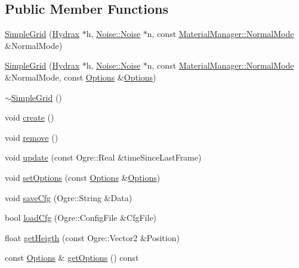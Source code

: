 \subsection*{Public Member Functions}
\begin{CompactItemize}
\item 
\hyperlink{class_hydrax_1_1_module_1_1_simple_grid_1576c59a302b3c24ac3d7dd8598e608c}{SimpleGrid} (\hyperlink{class_hydrax_1_1_hydrax}{Hydrax} $\ast$h, \hyperlink{class_hydrax_1_1_noise_1_1_noise}{Noise::Noise} $\ast$n, const \hyperlink{class_hydrax_1_1_material_manager_aa14689cd1c259f48954dfecda9b296f}{MaterialManager::NormalMode} \&NormalMode)
\item 
\hyperlink{class_hydrax_1_1_module_1_1_simple_grid_ae091cd103798dcc8f8b92af7dbfccef}{SimpleGrid} (\hyperlink{class_hydrax_1_1_hydrax}{Hydrax} $\ast$h, \hyperlink{class_hydrax_1_1_noise_1_1_noise}{Noise::Noise} $\ast$n, const \hyperlink{class_hydrax_1_1_material_manager_aa14689cd1c259f48954dfecda9b296f}{MaterialManager::NormalMode} \&NormalMode, const \hyperlink{struct_hydrax_1_1_module_1_1_simple_grid_1_1_options}{Options} \&\hyperlink{struct_hydrax_1_1_module_1_1_simple_grid_1_1_options}{Options})
\item 
\hyperlink{class_hydrax_1_1_module_1_1_simple_grid_a697faa687d55e5f211bae56e0ec9d14}{$\sim$SimpleGrid} ()
\item 
void \hyperlink{class_hydrax_1_1_module_1_1_simple_grid_7e52fb7497f6a2d27666a384d7a1d003}{create} ()
\item 
void \hyperlink{class_hydrax_1_1_module_1_1_simple_grid_ca3e257313599b797b8a65442cecd3cc}{remove} ()
\item 
void \hyperlink{class_hydrax_1_1_module_1_1_simple_grid_aa120d4f487785136a3134cc8980fb16}{update} (const Ogre::Real \&timeSinceLastFrame)
\item 
void \hyperlink{class_hydrax_1_1_module_1_1_simple_grid_6b83cb95b2803b068a53bf76afaa9ac4}{setOptions} (const \hyperlink{struct_hydrax_1_1_module_1_1_simple_grid_1_1_options}{Options} \&\hyperlink{struct_hydrax_1_1_module_1_1_simple_grid_1_1_options}{Options})
\item 
void \hyperlink{class_hydrax_1_1_module_1_1_simple_grid_f79cb3a457da1fe8b015d9d7b5a6a376}{saveCfg} (Ogre::String \&Data)
\item 
bool \hyperlink{class_hydrax_1_1_module_1_1_simple_grid_3741ec1a3df1863e730711fd9d3b14e1}{loadCfg} (Ogre::ConfigFile \&CfgFile)
\item 
float \hyperlink{class_hydrax_1_1_module_1_1_simple_grid_9a9e5bba632f0317c82370fa433559ac}{getHeigth} (const Ogre::Vector2 \&Position)
\item 
const \hyperlink{struct_hydrax_1_1_module_1_1_simple_grid_1_1_options}{Options} \& \hyperlink{class_hydrax_1_1_module_1_1_simple_grid_bcc8d6a849224e8558162adb8f3baf69}{getOptions} () const 
\end{CompactItemize}


